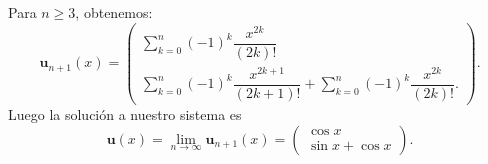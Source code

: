 \begin{ejemplo}
\begin{equation}
	\end{equation}
	Para $n \geqslant 3$, obtenemos:
	\begin{equation}
		\textbf{u}_{n+1}(x)= \begin{pmatrix}	\sum_{k=0}^{n}(-1)^k\dfrac{x^{2k}}{(2k)!} \\ \sum_{k=0}^{n}(-1)^k\dfrac{x^{2k+1}}{(2k+1)!} + \sum_{k=0}^{n}(-1)^k\dfrac{x^{2k}}{(2k)!}.	\end{pmatrix}.
	\end{equation}
	Luego la solución a nuestro sistema es
	\begin{equation}
		\textbf{u}(x) = \lim_{n \rightarrow \infty} \textbf{u}_{n+1}(x) = \begin{pmatrix}	\cos x \\ \sin x + \cos x	\end{pmatrix}.
	\end{equation}
\end{ejemplo}


\endinput
